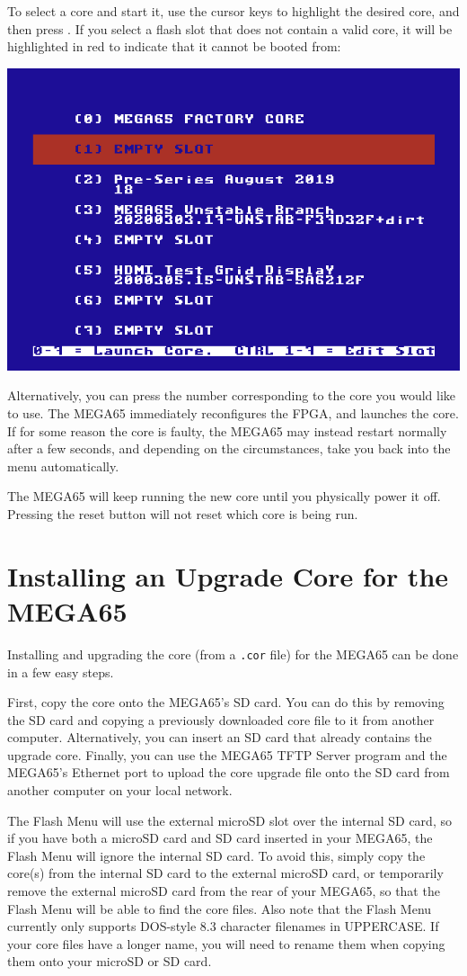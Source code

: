 To select a core and start it, use the cursor keys to highlight the desired core, and then press
.  If you select a flash slot that does not
contain a valid core, it will be highlighted in red to indicate that it
cannot be booted from:

\begin{center}
\includegraphics[trim= 0  0 0 10mm,clip,width=0.7\linewidth]{images/ss-flashmenu-invalidslot.png}
\end{center}

Alternatively, you can press the number corresponding to the core you would
like to use. The MEGA65 immediately reconfigures the FPGA, and launches the core.  If for some reason
the core is faulty, the MEGA65 may instead restart normally after a few seconds, and depending on the
circumstances, take you back into the menu automatically.

The MEGA65 will keep running the new core until you physically power it off.  Pressing the reset button
will not reset which core is being run.

\section{Installing an Upgrade Core for the MEGA65}

Installing and upgrading the core (from a {\tt .cor} file) for the MEGA65 can be done in a few easy steps.

First, copy the core onto the MEGA65's SD card. You can do this by removing the SD card and copying a previously
downloaded core file to it from another computer. Alternatively,
you can insert an SD card that already contains the upgrade core. Finally, you can use the MEGA65 TFTP Server
program and the MEGA65's Ethernet port to upload the core upgrade file onto the SD card from another computer
on your local network.

The Flash Menu will use the external microSD slot over
the internal SD card, so if you have both a microSD card and SD card
inserted in your MEGA65, the Flash Menu will ignore the
internal SD card. To avoid this, simply copy the core(s) from the internal SD
card to the external microSD card, or temporarily remove the external
microSD card from the rear of your MEGA65, so that the Flash Menu will
be able to find the core files.  Also note that the Flash Menu
currently only supports DOS-style 8.3 character filenames in UPPERCASE. If your
core files have a longer name, you will need to rename them when
copying them onto your microSD or SD card.


